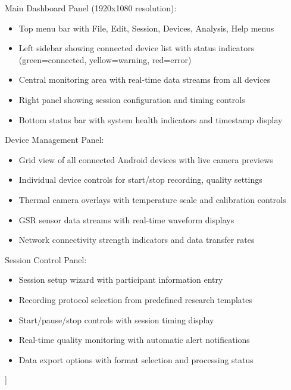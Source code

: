 \documentclass[12pt,a4paper]{report}
\begin{document}
Main Dashboard Panel (1920x1080 resolution):
\begin{itemize}
\item Top menu bar with File, Edit, Session, Devices, Analysis, Help menus
\item Left sidebar showing connected device list with status indicators (green=connected, yellow=warning, red=error)
\item Central monitoring area with real-time data streams from all devices
\item Right panel showing session configuration and timing controls
\item Bottom status bar with system health indicators and timestamp display

\end{itemize}
Device Management Panel:
\begin{itemize}
\item Grid view of all connected Android devices with live camera previews
\item Individual device controls for start/stop recording, quality settings
\item Thermal camera overlays with temperature scale and calibration controls
\item GSR sensor data streams with real-time waveform displays
\item Network connectivity strength indicators and data transfer rates

\end{itemize}
Session Control Panel:
\begin{itemize}
\item Session setup wizard with participant information entry
\item Recording protocol selection from predefined research templates
\item Start/pause/stop controls with session timing display
\item Real-time quality monitoring with automatic alert notifications
\item Data export options with format selection and processing status
\end{itemize}
]
\end{document}
